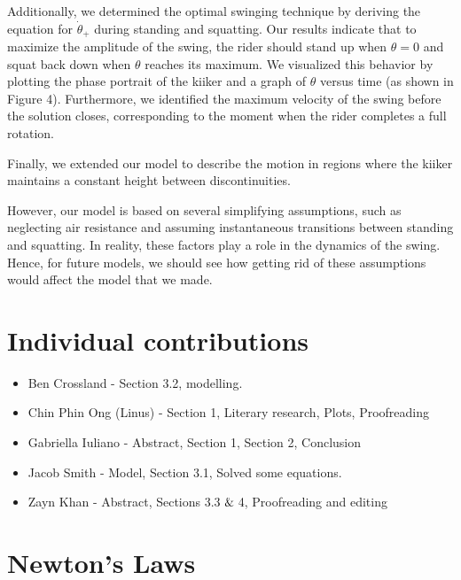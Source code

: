 \documentclass[12pt]{article}
\begin{document}
Additionally, we determined the optimal swinging technique by deriving the equation for \(\dot{\theta}_{+}\) during standing and squatting. Our results indicate that to maximize the amplitude of the swing, the rider should stand up when \(\theta = 0\) and squat back down when \(\theta\) reaches its maximum. We visualized this behavior by plotting the phase portrait of the kiiker and a graph of \(\theta\) versus time (as shown in Figure 4). Furthermore, we identified the maximum velocity of the swing before the solution closes, corresponding to the moment when the rider completes a full rotation.  

Finally, we extended our model to describe the motion in regions where the kiiker maintains a constant height between discontinuities.  

However, our model is based on several simplifying assumptions, such as neglecting air resistance and assuming instantaneous transitions between standing and squatting. In reality, these factors play a role in the dynamics of the swing.  Hence, for future models, we should see how getting rid of these assumptions would affect the model that we made.



\section{Individual contributions}
\begin{itemize}
    \item Ben Crossland - Section 3.2, modelling.
    \item Chin Phin Ong (Linus) - Section 1, Literary research, Plots, Proofreading
    \item Gabriella Iuliano - Abstract, Section 1, Section 2, Conclusion
    \item Jacob Smith - Model, Section 3.1, Solved some equations.
    \item Zayn Khan - Abstract, Sections 3.3$\And$4, Proofreading and editing
\end{itemize}




\appendix
\section{Newton's Laws}
\end{document}
